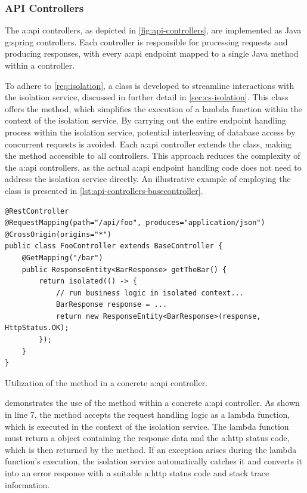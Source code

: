 \subsubsection{API Controllers}\label{sec:cs-api-controllers}

The \gls{a:api} controllers, as depicted in \cref{fig:api-controllers}, are implemented as Java \gls{g:spring} controllers. Each controller is responsible for processing requests and producing responses, with every \gls{a:api} endpoint mapped to a single Java method within a controller.

To adhere to \cref{req:isolation}, a  class is developed to streamline interactions with the isolation service, discussed in further detail in \cref{sec:cs-isolation}. This class offers the  method, which simplifies the execution of a lambda function within the context of the isolation service. By carrying out the entire endpoint handling process within the isolation service, potential interleaving of database access by concurrent requests is avoided. Each \gls{a:api} controller extends the  class, making the  method accessible to all controllers. This approach reduces the complexity of the \gls{a:api} controllers, as the actual \gls{a:api} endpoint handling code does not need to address the isolation service directly. An illustrative example of employing the  class is presented in \cref{lst:api-controllers-basecontroller}.

\begin{listing}[H]
\begin{verbatim}
@RestController
@RequestMapping(path="/api/foo", produces="application/json")
@CrossOrigin(origins="*")
public class FooController extends BaseController {
    @GetMapping("/bar")
    public ResponseEntity<BarResponse> getTheBar() {
        return isolated(() -> {
            // run business logic in isolated context...
            BarResponse response = ...
            return new ResponseEntity<BarResponse>(response, HttpStatus.OK);
        });
    }
}
\end{verbatim}
\caption{Utilization of the  method in a concrete \gls{a:api} controller.}
\label{lst:api-controllers-basecontroller}
\end{listing}

 demonstrates the use of the  method within a concrete \gls{a:api} controller. As shown in line 7, the  method accepts the request handling logic as a lambda function, which is executed in the context of the isolation service. The lambda function must return a  object containing the response data and the \gls{a:http} status code, which is then returned by the  method. If an exception arises during the lambda function's execution, the isolation service automatically catches it and converts it into an error response with a suitable \gls{a:http} status code and stack trace information.

